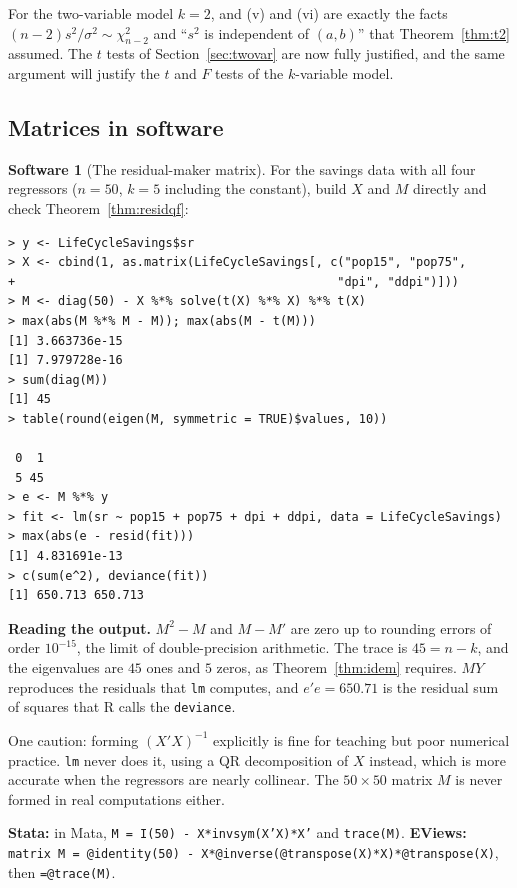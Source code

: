 \documentclass[11pt,a4paper]{article}
\numberwithin{equation}{section}
\theoremstyle{definition}
\newtheorem{software}[thm]{Software}
\begin{document}
For the two-variable model $k = 2$, and (v) and (vi) are exactly the facts $(n-2)s^2/\sigma^2 \sim \chi^2_{n-2}$ and ``$s^2$ is independent of $(a, b)$'' that
Theorem~\ref{thm:t2} assumed. The $t$ tests of Section~\ref{sec:twovar} are now fully justified, and the same argument will justify the $t$ and $F$ tests
of the $k$-variable model.

\subsection{Matrices in software}
\label{ssec:software5}

\begin{software}[The residual-maker matrix]
\label{sw:Mmatrix}
For the savings data with all four regressors ($n = 50$, $k = 5$ including the constant), build $X$ and $M$ directly and check
Theorem~\ref{thm:residqf}:
{\small\begin{verbatim}
> y <- LifeCycleSavings$sr
> X <- cbind(1, as.matrix(LifeCycleSavings[, c("pop15", "pop75",
+                                             "dpi", "ddpi")]))
> M <- diag(50) - X %*% solve(t(X) %*% X) %*% t(X)
> max(abs(M %*% M - M)); max(abs(M - t(M)))
[1] 3.663736e-15
[1] 7.979728e-16
> sum(diag(M))
[1] 45
> table(round(eigen(M, symmetric = TRUE)$values, 10))

 0  1
 5 45
> e <- M %*% y
> fit <- lm(sr ~ pop15 + pop75 + dpi + ddpi, data = LifeCycleSavings)
> max(abs(e - resid(fit)))
[1] 4.831691e-13
> c(sum(e^2), deviance(fit))
[1] 650.713 650.713
\end{verbatim}}
\textbf{Reading the output.} $M^2 - M$ and $M - M'$ are zero up to rounding errors of order $10^{-15}$, the limit of double-precision arithmetic. The
trace is $45 = n - k$, and the eigenvalues are $45$ ones and $5$ zeros, as Theorem~\ref{thm:idem} requires. $MY$ reproduces the residuals that \texttt{lm}
computes, and $e'e = 650.71$ is the residual sum of squares that R calls the \texttt{deviance}.

One caution: forming $(X'X)^{-1}$ explicitly is fine for teaching but poor numerical practice. \texttt{lm} never does it, using a QR
decomposition of $X$ instead, which is more accurate when the regressors are nearly collinear. The $50 \times 50$ matrix $M$ is never formed in real
computations either.

\textbf{Stata:} in Mata, \texttt{M = I(50) - X*invsym(X'X)*X'} and \texttt{trace(M)}. \textbf{EViews:} \texttt{matrix M = @identity(50) -
X*@inverse(@transpose(X)*X)*@transpose(X)}, then \texttt{=@trace(M)}.
\end{software}
\end{document}
